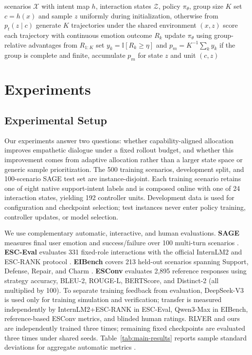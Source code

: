 \documentclass[letterpaper]{article}
\begin{document}
\begin{algorithm}[t]
\caption{Dual-Loop Self-Evolution with Verifiable Emotion Feedback}
\label{alg:egsec}
\begin{algorithmic}[1]
\REQUIRE scenarios $\mathcal X$ with intent map $h$, interaction states $\mathcal Z$, policy $\pi_\theta$, group size $K$
    \STATE set $c=h(x)$ and sample $z$ uniformly during initialization, otherwise from $p_t(z\mid c)$
    \STATE generate $K$ trajectories under the shared environment $(x,z)$
    \STATE score each trajectory with continuous emotion outcome $R_k$
    \STATE update $\pi_\theta$ using group-relative advantages from $R_{1:K}$
    \STATE set $y_k=\mathbb I[R_k\geq\eta]$ and $p_m=K^{-1}\sum_k y_k$
    \STATE if the group is complete and finite, accumulate $p_m$ for state $z$ and unit $(c,z)$
  \ENDFOR
\ENDFOR
\end{algorithmic}
\end{algorithm}

\section{Experiments}
\subsection{Experimental Setup}
Our experiments answer two questions: whether capability-aligned allocation improves empathetic dialogue under a fixed rollout budget, and whether this improvement comes from adaptive allocation rather than a larger state space or generic sample prioritization. The 500 training scenarios, development split, and 100-scenario SAGE test set are instance-disjoint. Each training scenario retains one of eight native support-intent labels and is composed online with one of 24 interaction states, yielding 192 controller units. Development data is used for configuration and checkpoint selection; test instances never enter policy training, controller updates, or model selection.

We use complementary automatic, interactive, and human evaluations. \textbf{SAGE} measures final user emotion and success/failure over 100 multi-turn scenarios \cite{sage2025}. \textbf{ESC-Eval} evaluates 331 fixed-role interactions with the official InternLM2 and ESC-RANK protocol \cite{zhao2024esceval}. \textbf{EIBench} covers 213 held-out scenarios spanning Support, Defense, Repair, and Charm \cite{eibench2026}. \textbf{ESConv} evaluates 2,895 reference responses using strategy accuracy, BLEU-2, ROUGE-L, BERTScore, and Distinct-2 (all multiplied by 100). To separate training feedback from evaluation, DeepSeek-V3 is used only for training simulation and verification; transfer is measured independently by InternLM2+ESC-RANK in ESC-Eval, Qwen3-Max in EIBench, reference-based ESConv metrics, and blinded human ratings. RLVER and ours are independently trained three times; remaining fixed checkpoints are evaluated three times under shared seeds. Table~\ref{tab:main-results} reports sample standard deviations for aggregate automatic metrics \cite{geval2023,llmdialogeval2024}.
\end{document}
